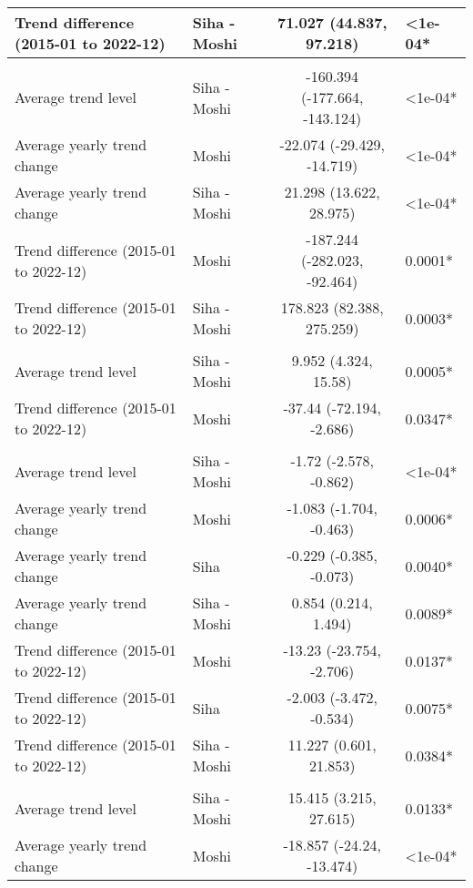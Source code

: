 \begin{longtable}{l|lcl}
Trend difference (2015-01 to 2022-12) & Siha - Moshi & 71.027 (44.837, 97.218) & <1e-04* \\ 
\midrule\addlinespace[2.5pt]
\multicolumn{4}{l}{Psychoses} \\[2.5pt] 
\midrule\addlinespace[2.5pt]
Average trend level & Siha - Moshi & -160.394 (-177.664, -143.124) & <1e-04* \\ 
Average yearly trend change & Moshi & -22.074 (-29.429, -14.719) & <1e-04* \\ 
Average yearly trend change & Siha - Moshi & 21.298 (13.622, 28.975) & <1e-04* \\ 
Trend difference (2015-01 to 2022-12) & Moshi & -187.244 (-282.023, -92.464) & 0.0001* \\ 
Trend difference (2015-01 to 2022-12) & Siha - Moshi & 178.823 (82.388, 275.259) & 0.0003* \\ 
\midrule\addlinespace[2.5pt]
\multicolumn{4}{l}{Road Traffic Accidents} \\[2.5pt] 
\midrule\addlinespace[2.5pt]
Average trend level & Siha - Moshi & 9.952 (4.324, 15.58) & 0.0005* \\ 
Trend difference (2015-01 to 2022-12) & Moshi & -37.44 (-72.194, -2.686) & 0.0347* \\ 
\midrule\addlinespace[2.5pt]
\multicolumn{4}{l}{Schistosomiasis} \\[2.5pt] 
\midrule\addlinespace[2.5pt]
Average trend level & Siha - Moshi & -1.72 (-2.578, -0.862) & <1e-04* \\ 
Average yearly trend change & Moshi & -1.083 (-1.704, -0.463) & 0.0006* \\ 
Average yearly trend change & Siha & -0.229 (-0.385, -0.073) & 0.0040* \\ 
Average yearly trend change & Siha - Moshi & 0.854 (0.214, 1.494) & 0.0089* \\ 
Trend difference (2015-01 to 2022-12) & Moshi & -13.23 (-23.754, -2.706) & 0.0137* \\ 
Trend difference (2015-01 to 2022-12) & Siha & -2.003 (-3.472, -0.534) & 0.0075* \\ 
Trend difference (2015-01 to 2022-12) & Siha - Moshi & 11.227 (0.601, 21.853) & 0.0384* \\ 
\midrule\addlinespace[2.5pt]
\multicolumn{4}{l}{Skin Infection - Fungal} \\[2.5pt] 
\midrule\addlinespace[2.5pt]
Average trend level & Siha - Moshi & 15.415 (3.215, 27.615) & 0.0133* \\ 
Average yearly trend change & Moshi & -18.857 (-24.24, -13.474) & <1e-04* \\ 

\end{longtable}
